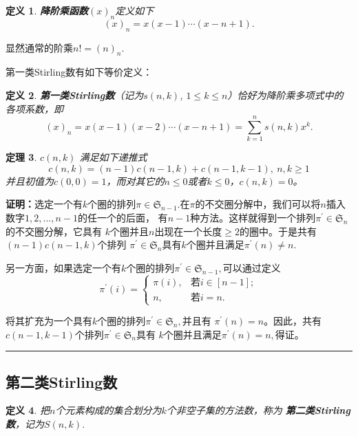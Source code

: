 \documentclass[a4paper,11pt,twoside]{book}
\newtheorem{thm}{定理}[section]
\newtheorem{defi}[thm]{定义}
\def\qed{\nopagebreak\hfill{\rule{4pt}{7pt}}\medbreak}
\begin{document}
\begin{defi}
{\bf 降阶乘函数}$(x)_n$定义如下
$$(x)_n=x(x-1)\cdots(x-n+1).$$
\end{defi}

显然通常的阶乘$n!=(n)_n.$

第一类Stirling数有如下等价定义：

\begin{defi}
{\bf 第一类Stirling数}（记为$s(n,k)$, $1\leq k\leq
n$）恰好为降阶乘多项式中的各项系数，即
\begin{equation}
(x)_n=x(x-1)(x-2)\cdots(x-n+1)=\sum_{k=1}^n{s(n,k)x^k}.
\end{equation}
\end{defi}

\begin{thm}
$c(n,k)$ 满足如下递推式
$$c(n,k)=(n-1)c(n-1,k)+c(n-1,k-1),\  n,k\geq 1$$
并且初值为$c(0,0)=1$，而对其它的$n\leq 0$或者$k\leq 0$，$c(n,k)=0$。
\end{thm}

{\bf 证明：}选定一个有$k$个圈的排列$\pi\in\mathfrak{S}_{n-1}.$在$
\pi$的不交圈分解中，我们可以将$n$插入数字$1,2,\ldots,n-1$的任一个的后面，
有$n-1$种方法。这样就得到一个排列$\pi^{'}\in\mathfrak{S}_n$的不交圈分解，它具有
$k$个圈并且$n$出现在一个长度$\geq
2$的圈中。于是共有$(n-1)c(n-1,k)$个排列
$\pi^{'}\in\mathfrak{S}_n$具有$k$个圈并且满足$\pi^{'}(n)\neq n.$

另一方面，如果选定一个有$k$个圈的排列$\pi^{'}\in\mathfrak{S}_{n-1},$可以通过定义
  $$\pi^{'}(i)=\left\{\begin{array}{ll}
                          \pi(i), & \mbox{若}i\in[n-1]; \\
                          n, &\mbox{若} i=n.
                        \end{array}\right.
    $$

将其扩充为一个具有$k$个圈的排列$\pi^{'}\in\mathfrak{S}_n,$并且有
$\pi^{'}(n)=n$。因此，共有$c(n-1,k-1)$个排列$\pi^{'}\in\mathfrak{S}_n$具有
$k$个圈并且满足$\pi^{'}(n)=n,$得证。\qed

\subsection{第二类Stirling数}
\begin{defi}
把$n$个元素构成的集合划分为$k$个非空子集的方法数，称为{\bf
第二类Stirling数}，记为$S(n,k)$.
\end{defi}
\end{document}
